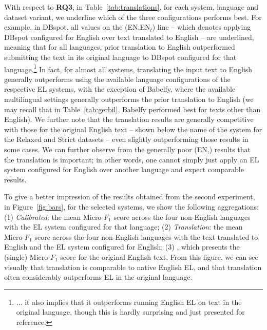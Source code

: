 \documentclass{llncs}
\begin{document}

With respect to \textbf{RQ3}, in Table~\ref{tab:translations}, for each system, language and dataset variant, we underline which of the three configurations performs best. For example, in DBspot, all values on the (EN,EN$_t$) line -- which denotes applying DBspot configured for English over text translated to English -- are underlined, meaning that for all languages, prior translation to English outperformed submitting the text in its original language to DBspot configured for that language.\footnote{$\ldots$ it also implies that it outperforms running English EL on text in the original language, though this is hardly surprising and just presented for reference.}
In fact, for almost all systems, translating the input text to English generally outperforms using the available language configurations of the respective EL systems, with the exception of Babelfy, where the available multilingual settings generally outperforms the prior translation to English (we may recall that in Table~\ref{tab:gerbil}, Babelfy performed best for texts other than English). We further note that the translation results are generally competitive with those for the original English text -- shown below the name of the system for the Relaxed and Strict datasets -- even slightly outperforming those results in some cases. We can further observe from the generally poor (EN,\blank) results that the translation is important; in other words, one cannot simply just apply an EL system configured for English over another language and expect comparable results.

To give a better impression of the results obtained from the second experiment, in Figure~\ref{fig:bars}, for the selected systems, we show the following aggregations: (1) \textit{Calibrated}: the mean Micro-$F_1$ score across the four non-English languages with the EL system configured for that language; (2) \textit{Translation}: the mean Micro-$F_1$ score across the four non-English languages with the text translated to English and the EL system configured for English; (3) , which presents the (single) Micro-$F_1$ score for the original English text. From this figure, we can see visually that translation is comparable to native English EL, and that translation often considerably outperforms EL in the original language. 
\end{document}
